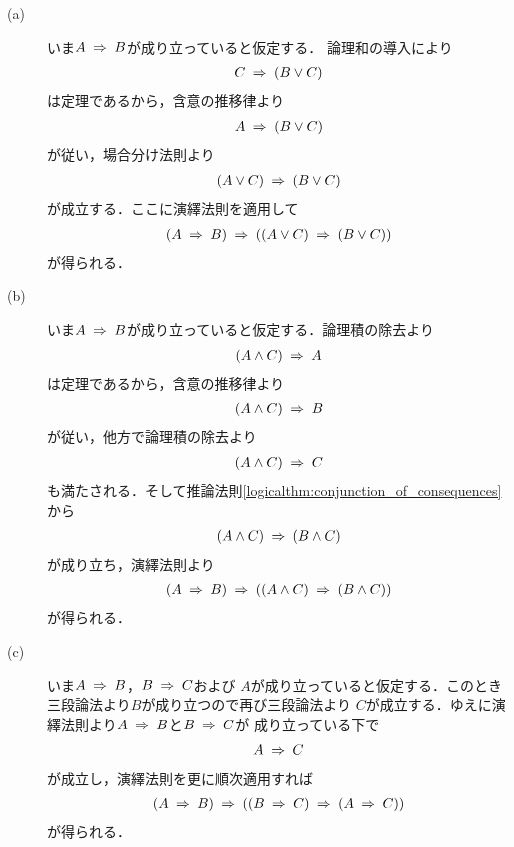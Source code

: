 	\begin{prf}\mbox{}
		\begin{description}
			\item[(a)]
				いま$A \rarrow B$が成り立っていると仮定する．
				論理和の導入により
				\begin{align}
					C \rarrow (B \vee C)
				\end{align}
				は定理であるから，含意の推移律より
				\begin{align}
					A \rarrow (B \vee C)
				\end{align}
				が従い，場合分け法則より
				\begin{align}
					(A \vee C) \rarrow (B \vee C)
				\end{align}
				が成立する．ここに演繹法則を適用して
				\begin{align}
					(A \rarrow B) \rarrow 
					( (A \vee C) \rarrow (B \vee C) )
				\end{align}
				が得られる．
				
			\item[(b)]
				いま$A \rarrow B$が成り立っていると仮定する．論理積の除去より
				\begin{align}
					(A \wedge C) \rarrow A
				\end{align}
				は定理であるから，含意の推移律より
				\begin{align}
					(A \wedge C) \rarrow B
				\end{align}
				が従い，他方で論理積の除去より
				\begin{align}
					(A \wedge C) \rarrow C
				\end{align}
				も満たされる．そして推論法則\ref{logicalthm:conjunction_of_consequences}から
				\begin{align}
					(A \wedge C) \rarrow (B \wedge C)
				\end{align}
				が成り立ち，演繹法則より
				\begin{align}
					(A \rarrow B) \rarrow ((A \wedge C) \rarrow (B \wedge C))
				\end{align}
				が得られる．
				
			\item[(c)]
				いま$A \rarrow B$，$B \rarrow C$および
				$A$が成り立っていると仮定する．このとき三段論法より$B$が成り立つので再び三段論法より
				$C$が成立する．ゆえに演繹法則より$A \rarrow B$と$B \rarrow C$が
				成り立っている下で
				\begin{align}
					A \rarrow C
				\end{align}
				が成立し，演繹法則を更に順次適用すれば
				\begin{align}
					(A \rarrow B) \rarrow ( (B \rarrow C) \rarrow (A \rarrow C) )
				\end{align}
				が得られる．
				

\end{description}
\end{prf}
